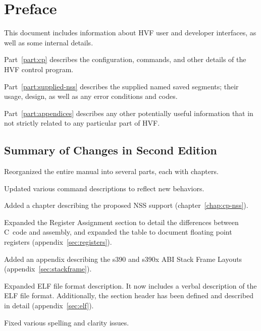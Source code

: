 \chapter*{Preface}
This document includes information about HVF user and developer interfaces,
as well as some internal details.

\cbstart
Part~\ref{part:cp} describes the configuration, commands, and other
details of the HVF control program.

Part~\ref{part:supplied-nss} describes the supplied named saved segments;
their usage, design, as well as any error conditions and codes.

Part~\ref{part:appendices} describes any other potentially useful
information that in not strictly related to any particular part of HVF.
\cbend

\cbstart
\section*{Summary of Changes in Second Edition}
Reorganized the entire manual into several parts, each with chapters.

Updated various command descriptions to reflect new behaviors.

Added a chapter describing the proposed NSS support (chapter~\ref{chap:cp-nss}).

Expanded the Register Assignment section to detail the differences between
C~code and assembly, and expanded the table to document floating point
registers (appendix~\ref{sec:registers}).

Added an appendix describing the s390 and s390x ABI Stack Frame Layouts
(appendix~\ref{sec:stackframe}).

Expanded ELF file format description.  It now includes a verbal description
of the ELF file format.  Additionally, the section header has been defined
and described in detail (appendix~\ref{sec:elf}).

Fixed various spelling and clarity issues.
\cbend
